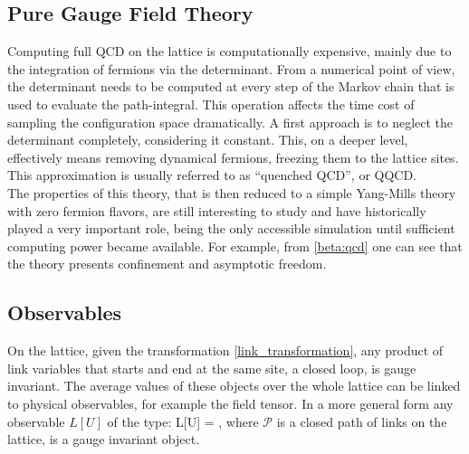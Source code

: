 \subsection{Pure Gauge Field Theory}
Computing full QCD on the lattice is computationally expensive, mainly due to the integration of fermions via the determinant. From a numerical point of view, the determinant needs to be computed at every step of the Markov chain that is used to evaluate the path-integral. This operation affects the time cost of sampling the configuration space dramatically. A first approach is to neglect the determinant completely, considering it constant. This, on a deeper level, effectively means removing dynamical fermions, freezing them to the lattice sites. This approximation is usually referred to as ``quenched QCD'', or QQCD. \\
The properties of this theory, that is then reduced to a simple Yang-Mills theory with zero fermion flavors, are still interesting to study and have historically played a very important role, being the only accessible simulation until sufficient computing power became available. For example, from \cref{beta:qcd} one can see that the theory presents confinement and asymptotic freedom. 

\subsection{Observables}
On the lattice, given the transformation \cref{link_transformation}, any product of link variables that starts and end at the same site, a closed loop, is gauge invariant. The average values of these objects over the whole lattice can be linked to physical observables, for example the field tensor. In a more general form any observable $L[U]$ of the type:
\beq
    L[U] = \Tr {},
\eeq
where $\mathcal{P}$ is a closed path of links on the lattice, is a gauge invariant object.

